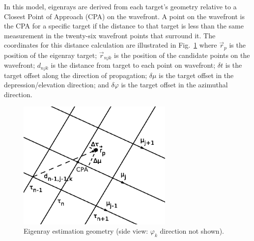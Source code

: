 \documentclass{ws-jca}
\begin{document}
In this model, eigenrays are derived from each target's geometry relative
to a Closest Point of Approach (CPA) on the wavefront. A point on the
wavefront is the CPA for a specific target if the distance to that target
is less than the same measurement in the twenty-six wavefront points that
surround it. The coordinates for this distance calculation are illustrated
in Fig.~\ref{fig:eigenray_geometry}
where
\(\vec{r}_{p}\) is the position of the eigenray target;
\(\vec{r}_{njk}\) is the position of the candidate points on the wavefront;
\(d_{njk}\) is the distance from target to each point on wavefront;
\(\delta t\) is the target offset along the direction of propagation;
\(\delta\mu\) is the target offset in the depression/elevation direction; and 
\(\delta\varphi\) is the target offset in the azimuthal direction.
\begin{figure}[th]
	\centerline{\includegraphics[width=3in]{EigenrayGeometry.eps}} 
	\vspace*{8pt}
	\caption{Eigenray estimation geometry 
		(side view: \(\varphi_k\) direction not shown).}
	\label{fig:eigenray_geometry}
\end{figure}
\end{document}
